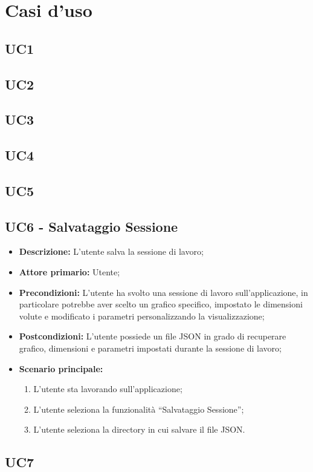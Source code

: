 \chapter{Casi d'uso}

\section{UC1}

\section{UC2}

\section{UC3}

\section{UC4}

\section{UC5}

\section{UC6 - Salvataggio Sessione}

\begin{itemize}
  \item \textbf{Descrizione:} L'utente salva la sessione di lavoro;
  \item \textbf{Attore primario:} Utente;
  \item \textbf{Precondizioni:} L'utente ha svolto una sessione di lavoro sull'applicazione, in particolare potrebbe aver scelto un grafico specifico, impostato le dimensioni volute e modificato i parametri personalizzando la visualizzazione;
  \item \textbf{Postcondizioni:} L'utente possiede un file JSON in grado di recuperare grafico, dimensioni e parametri impostati durante la sessione di lavoro;
  \item \textbf{Scenario principale:}
  \begin{enumerate}
    \item L'utente sta lavorando sull'applicazione;
    \item L'utente seleziona la funzionalità ``Salvataggio Sessione'';
    \item L'utente seleziona la directory in cui salvare il file JSON.
  \end{enumerate}
\end{itemize}

\section{UC7}

